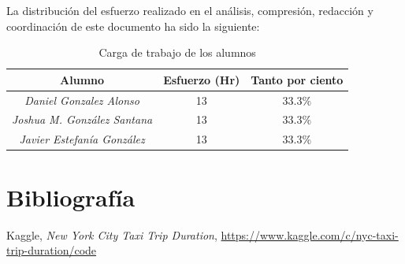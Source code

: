 \documentclass[12pt]{article}
\begin{document}
La distribución del esfuerzo realizado en el análisis, compresión, redacción y coordinación de este documento ha sido la siguiente:

\begin{table}[H]
\centering
\begin{tabular}{|c|c|c|}
\hline
Alumno         & Esfuerzo (Hr)    & Tanto por ciento  \\ \hline
\textit{Daniel Gonzalez Alonso}  &   13   & $33.3\%$      \\ \hline
\textit{Joshua M. González Santana}  & 13  & $33.3\%$      \\ \hline
\textit{Javier Estefanía González}  & 13  & $33.3\%$      \\ \hline
\end{tabular}
\caption{Carga de trabajo de los alumnos}
\end{table}

\section{Bibliografía}
\begin{thebibliography}{0}
      Kaggle,
      \emph{New York City Taxi Trip Duration},
      \url{https://www.kaggle.com/c/nyc-taxi-trip-duration/code}
\end{thebibliography}
\end{document}
